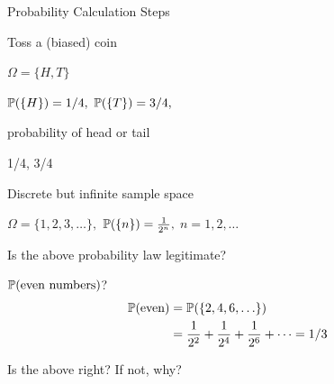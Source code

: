 \documentclass[fleqn,aspectratio=169]{beamer}
\begin{document}
\begin{frame}{Probability Calculation Steps}


{
Toss a (biased) coin

\plitemsep 0.1in

\bce
\item $\Omega = \{H,T \}$ 

\item $\mathbb{P}( \{H \} ) = 1/4,$ $\mathbb{P}( \{T \} ) = 3/4,$

\item probability of head or tail

\item 1/4, 3/4
\ece
}
\end{frame}

\begin{frame}{Discrete but infinite sample space}


\plitemsep 0.07in

\bci
\item $\Omega = \{1,2, 3, \ldots \},$  $\mathbb{P}( \{ n \} ) = \frac{1}{2^n},$ $n=1,2, \ldots$ 

\item<2-> Is the above probability law legitimate? 
{
}
\vspace{-0.3cm}
\item<4-> $\mathbb{P}( \text{even numbers} )$?
{
\begin{align*}
 \mathbb{P}( \text{even} ) 
 &= \mathbb{P}( \{2,4, 6, \ldots \} ) \cr    
 &= \frac{1}{2^2} + \frac{1}{2^4} + \frac{1}{2^6} + \cdots = 1/3
\end{align*}}

\item<6-> Is the above right? If not, why?

\eci

\end{frame}
\end{document}
